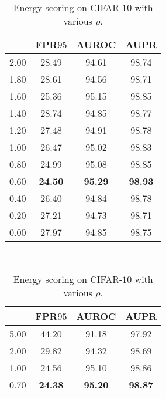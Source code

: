\documentclass{article}
\begin{document}
\begin{table}[t]
\centering
\parbox{.30\linewidth}{
\centering
\scriptsize
\caption{Energy scoring on CIFAR-$10$  with various $\sigma_1$.} \label{tab: ablation sigma full cifar10}
\vspace{5pt}
{
\begin{tabular}{c|ccc}
\toprule[1.5pt]
            & FPR$95$     & AUROC       & AUPR      \\
\midrule[0.6pt]
2.00        & 28.49       & 94.61       & 98.74     \\
1.80        & 28.61       & 94.56       & 98.71     \\
1.60        & 25.36       & 95.15       & 98.85     \\
1.40        & 28.74       & 94.85       & 98.77     \\
1.20        & 27.48       & 94.91       & 98.78     \\
1.00        & 26.47       & 95.02       & 98.83     \\
0.80        & 24.99       & 95.08       & 98.85     \\
\cellcolor{greyC}0.60        & \cellcolor{greyC}\textbf{24.50}       & \cellcolor{greyC}\textbf{95.29}       & \cellcolor{greyC}\textbf{98.93}     \\
0.40        & 26.40       & 94.84       & 98.78     \\
0.20        & 27.21       & 94.73       & 98.71     \\
0.00        & 27.97       & 94.85       & 98.75     \\
\bottomrule[1.5pt]      
\end{tabular}
}}~~
\parbox{.30\linewidth}{
\centering
\caption{Energy scoring on CIFAR-$10$  with various $\rho$.} 
\scriptsize
\vspace{5pt}
{
\begin{tabular}{c|ccc}
\toprule[1.5pt]
             & FPR$95$     & AUROC      & AUPR      \\
\midrule[0.6pt]
5.00               & 44.20                  & 91.18                  & 97.92 \\
2.00               & 29.82                  & 94.32                  & 98.69 \\
1.00               & 24.56                  & 95.10                  & 98.86 \\
\cellcolor{greyC}0.70               &  \cellcolor{greyC}\textbf{24.38}                  &  \cellcolor{greyC}\textbf{95.20}                  &  \cellcolor{greyC}\textbf{98.87} \\

\end{tabular}}}
\end{table}
\end{document}
